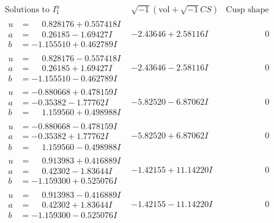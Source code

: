 \documentclass[1p]{elsarticle_modified}
\theoremstyle{definition}
\newcommand{\I}{\sqrt{-1}}
\begin{document}
$$\begin{array}{c|c|c}  
\text{Solutions to }I^u_{1}& \I (\text{vol} + \sqrt{-1}CS) & \text{Cusp shape}\\
 \hline 
\begin{aligned}
u &= \phantom{-}0.828176 + 0.557418 I \\
a &= \phantom{-}0.26185 - 1.69427 I \\
b &= -1.155510 + 0.462789 I\end{aligned}
 & -2.43646 + 2.58116 I & \phantom{-0.000000 } 0 \\ \hline\begin{aligned}
u &= \phantom{-}0.828176 - 0.557418 I \\
a &= \phantom{-}0.26185 + 1.69427 I \\
b &= -1.155510 - 0.462789 I\end{aligned}
 & -2.43646 - 2.58116 I & \phantom{-0.000000 } 0 \\ \hline\begin{aligned}
u &= -0.880668 + 0.478159 I \\
a &= -0.35382 - 1.77762 I \\
b &= \phantom{-}1.159560 + 0.498988 I\end{aligned}
 & -5.82520 - 6.87062 I & \phantom{-0.000000 } 0 \\ \hline\begin{aligned}
u &= -0.880668 - 0.478159 I \\
a &= -0.35382 + 1.77762 I \\
b &= \phantom{-}1.159560 - 0.498988 I\end{aligned}
 & -5.82520 + 6.87062 I & \phantom{-0.000000 } 0 \\ \hline\begin{aligned}
u &= \phantom{-}0.913983 + 0.416889 I \\
a &= \phantom{-}0.42302 - 1.83644 I \\
b &= -1.159300 + 0.525076 I\end{aligned}
 & -1.42155 + 11.14220 I & \phantom{-0.000000 } 0 \\ \hline\begin{aligned}
u &= \phantom{-}0.913983 - 0.416889 I \\
a &= \phantom{-}0.42302 + 1.83644 I \\
b &= -1.159300 - 0.525076 I\end{aligned}
 & -1.42155 - 11.14220 I & \phantom{-0.000000 } 0 \\ \hline\begin{aligned}

\end{aligned}
\end{array}$$
\end{document}

